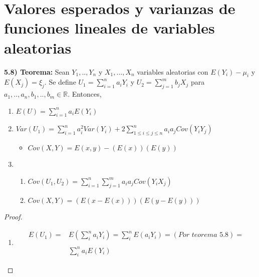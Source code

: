 \documentclass[12pt,letterpaper]{article}
\theoremstyle{definition}
\begin{document}
\section*{Valores esperados y varianzas de funciones lineales de variables aleatorias}

\textbf{5.8) Teorema:} Sean $Y_1,..,Y_n$ y $X_1,...,X_n$ variables aleatorias con $E(Y_i)-\mu_i$ y $E(X_j)=\xi_j$. Se define $U_1=\sum\limits^{n}_{i=1}a_iY_i$ y $U_2=\sum\limits^{m}_{j=1}b_jX_j$ para $a_1,..,a_n,b_1,..,b_m\in\mathbb{R}$. Entonces, 

\begin{enumerate}
	\item $E(U)=\sum\limits^{n}_{i=1} a_iE(Y_i)$
	\item $Var(U_1)=\sum\limits^{n}_{i=1} a_i^2 Var(Y_i)+2\sum\limits^{n}_{1\leq i\leq j \leq n}a_ia_j Cov(Y_iY_j)$
	\begin{itemize}
		\item $Cov(X,Y)=E(x,y)-(E(x))(E(y))$
	\end{itemize}
	\item
	\begin{enumerate}
		\item $Cov(U_1,U_2)= \sum\limits^{n}_{i=1}\sum\limits^{m}_{j=1}a_ia_jCov(Y_iX_j)$
		\item $Cov(X,Y)=(E(x-E(x)))(E(y-E(y)))$
	\end{enumerate}	 
\end{enumerate}
\begin{proof}
	\begin{enumerate}
		\item 
		\[
		\begin{array}{rl}
			E(U_1)= &E(\sum^n_i  a_iY_i)=\sum^n_iE(a_iY_i)=(\mathrm{\textit{Por teorema 5.8}})=\\ \\
			&\sum^n_i a_i E(Y_i)
		\end{array}
		\]
	\end{enumerate}
\end{proof}
\end{document}
